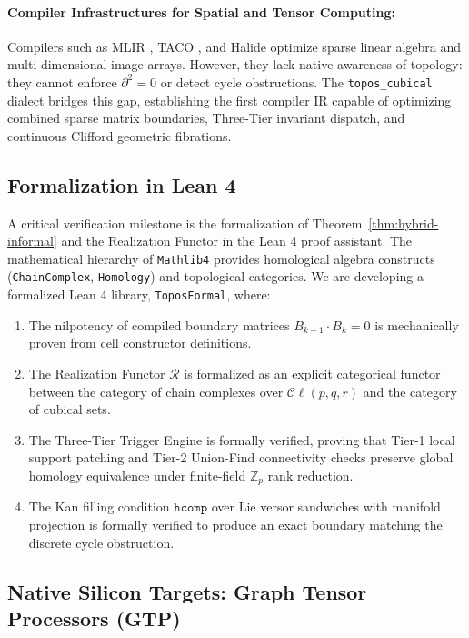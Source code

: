 \documentclass[acmsmall,screen,nonacm]{acmart}
\newcommand{\Cl}{\mathcal{C}\ell}
\newcommand{\Real}{\mathcal{R}}
\newcommand{\hcomp}{\texttt{hcomp}}
\begin{document}
\paragraph{Compiler Infrastructures for Spatial and Tensor Computing:}
Compilers such as MLIR \cite{lattner2021mlir}, TACO \cite{kjolstad2017taco}, and Halide \cite{ragan2013halide} optimize sparse linear algebra and multi-dimensional image arrays. However, they lack native awareness of topology: they cannot enforce $\partial^2 = 0$ or detect cycle obstructions. The \texttt{topos\_cubical} dialect bridges this gap, establishing the first compiler IR capable of optimizing combined sparse matrix boundaries, Three-Tier invariant dispatch, and continuous Clifford geometric fibrations.

\subsection{Formalization in Lean 4}
\label{sec:lean4-formalization}

A critical verification milestone is the formalization of Theorem~\ref{thm:hybrid-informal} and the Realization Functor in the Lean 4 proof assistant. The mathematical hierarchy of \texttt{Mathlib4} provides homological algebra constructs (\texttt{ChainComplex}, \texttt{Homology}) and topological categories. We are developing a formalized Lean 4 library, \texttt{ToposFormal}, where:
\begin{enumerate}
    \item The nilpotency of compiled boundary matrices $B_{k-1} \cdot B_k = 0$ is mechanically proven from cell constructor definitions.
    \item The Realization Functor $\Real$ is formalized as an explicit categorical functor between the category of chain complexes over $\Cl(p,q,r)$ and the category of cubical sets.
    \item The Three-Tier Trigger Engine is formally verified, proving that Tier-1 local support patching and Tier-2 Union-Find connectivity checks preserve global homology equivalence under finite-field $\mathbb{Z}_p$ rank reduction.
    \item The Kan filling condition $\hcomp$ over Lie versor sandwiches with manifold projection is formally verified to produce an exact boundary matching the discrete cycle obstruction.
\end{enumerate}

\subsection{Native Silicon Targets: Graph Tensor Processors (GTP)}
\label{sec:gtp-silicon}
\end{document}
